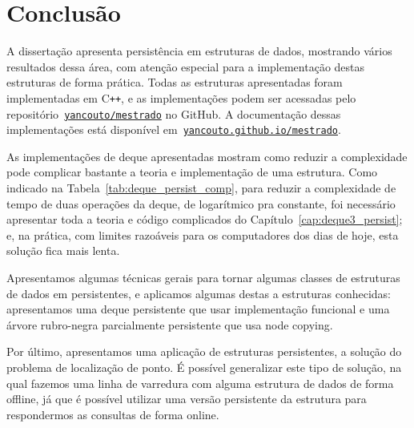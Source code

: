 \documentclass[main.tex]{subfiles}
\begin{document}
\setcounter{secnumdepth}{0}

\chapter*{Conclusão}

A dissertação apresenta persistência em estruturas de dados, mostrando vários resultados dessa área, com atenção especial para a implementação destas estruturas de forma prática. Todas as estruturas apresentadas foram implementadas em C\texttt{++}, e as implementações podem ser acessadas pelo repositório~\mbox{\href{https://github.com/yancouto/mestrado/}{\texttt{yancouto/mestrado}}} no GitHub. A documentação dessas implementações está disponível em~\mbox{\href{https://yancouto.github.io/mestrado/}{\texttt{yancouto.github.io/mestrado}}}.

As implementações de deque apresentadas mostram como reduzir a complexidade pode complicar bastante a teoria e implementação de uma estrutura. Como indicado na Tabela~\ref{tab:deque_persist_comp}, para reduzir a complexidade de tempo de duas operações da deque, de logarítmico pra constante, foi necessário apresentar toda a teoria e código complicados do Capítulo~\ref{cap:deque3_persist}; e, na prática, com limites razoáveis para os computadores dos dias de hoje, esta solução fica mais lenta.

Apresentamos algumas técnicas gerais para tornar algumas classes de estruturas de dados em persistentes, e aplicamos algumas destas a estruturas conhecidas: apresentamos uma deque persistente que usar implementação funcional e uma árvore rubro-negra parcialmente persistente que usa node copying.

Por último, apresentamos uma aplicação de estruturas persistentes, a solução do problema de localização de ponto. É possível generalizar este tipo de solução, na qual fazemos uma linha de varredura com alguma estrutura de dados de forma offline, já que é possível utilizar uma versão persistente da estrutura para respondermos as consultas de forma online.

\setcounter{secnumdepth}{1}
\end{document}

